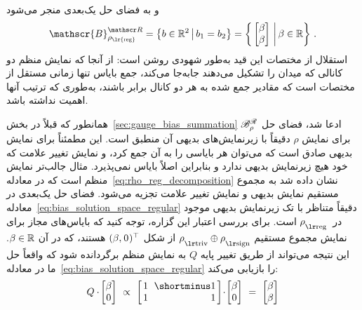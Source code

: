 و به فضای حل یک‌بعدی منجر می‌شود
\begin{align}\label{eq:bias_solution_space_regular}
	\mathscr{B}^{\Flip}_{\scalebox{.8}{$\rho_{{\textup{\lr{reg}}}}$}} = 
	\big\{ b\in\R^2 \,\big|\, b_1=b_2 \big\} =
	\bigg\{ \begin{bmatrix} \beta \\ \beta \end{bmatrix} \,\bigg|\, \beta\in\R \bigg\} \ .
\end{align}
استقلال از مختصات این قید به‌طور شهودی روشن است:
از آنجا که نمایش منظم دو کانالی که میدان را تشکیل می‌دهند جابه‌جا می‌کند، جمع بایاس تنها زمانی مستقل از مختصات است که مقادیر جمع شده به هر دو کانال برابر باشند، به‌طوری که ترتیب آنها اهمیت نداشته باشد.

همانطور که قبلاً در بخش~\ref{sec:gauge_bias_summation} ادعا شد، فضای حل $\mathscr{B}^{\mathscr{R}}_\rho$ برای نمایش $\rho$ دقیقاً با زیرنمایش‌های بدیهی آن منطبق است.
این مطمئناً برای نمایش بدیهی صادق است که می‌توان هر بایاسی را به آن جمع کرد، و نمایش تغییر علامت که خود هیچ زیرنمایش بدیهی ندارد و بنابراین اصلاً بایاس نمی‌پذیرد.
مثال جالب‌تر نمایش منظم است که در معادله~\ref{eq:rho_reg_decomposition} نشان داده شد به مجموع مستقیم نمایش بدیهی و نمایش تغییر علامت تجزیه می‌شود.
فضای حل یک‌بعدی در معادله~\ref{eq:bias_solution_space_regular} دقیقاً متناظر با تک زیرنمایش بدیهی موجود در~$\rhoreg$ است.
برای بررسی اعتبار این گزاره، توجه کنید که بایاس‌های مجاز برای نمایش مجموع مستقیم $\rhotriv \oplus \rhosign$ از شکل $(\beta,\mkern1mu 0\mkern1mu)^\top$ هستند، که در آن $\beta\in\mathbb{R}$.
این نتیجه می‌تواند از طریق تغییر پایه $Q$ به نمایش منظم برگردانده شود که واقعاً حل ما در معادله~\eqref{eq:bias_solution_space_regular} را بازیابی می‌کند:
\begin{align}
	Q \cdot\mkern-2mu \begin{bmatrix} \beta \\ 0 \end{bmatrix}
	\ \propto\ 
	\begin{bmatrix} \hspace{1.5pt}
		1 &\mkern-7mu \shortminus1 \hspace*{1.5pt} \\ \hspace{1.5pt} 1 &\mkern-7mu \phantom{\shortminus}1 \hspace*{1.5pt}
	\end{bmatrix}
	\!\cdot\! \begin{bmatrix} \beta \\ 0 \end{bmatrix}
	\ =\ 
	\begin{bmatrix} \beta \\ \beta \end{bmatrix}
\end{align}





